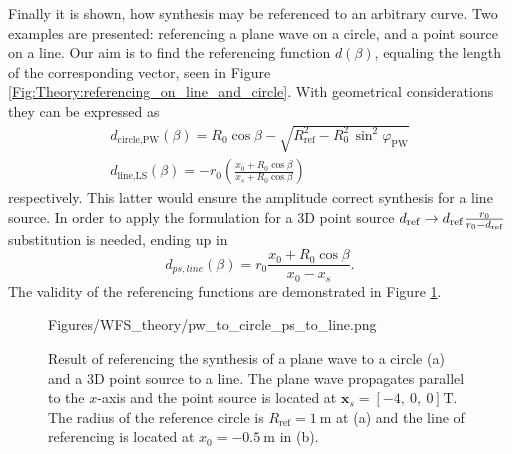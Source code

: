 Finally it is shown, how synthesis may be referenced to an arbitrary curve. 
Two examples are presented: referencing a plane wave on a circle, and a point source on a line.
Our aim is to find the referencing function $d(\beta)$, equaling the length of the corresponding vector, seen in Figure \ref{Fig:Theory:referencing_on_line_and_circle}. With geometrical considerations they can be expressed as
\begin{eqnarray}
d_\text{circle,PW}(\beta) = R_0\cos \beta - \sqrt{ R_{\mathrm{ref}}^2 - R_0^2\,\sin^2\varphi_\text{PW} }
\\
d_\text{line,LS}(\beta) = -r_0 \left( \frac{x_0 + R_0\cos \beta}{x_s + R_0\cos \beta} \right)
\end{eqnarray}
respectively. 
This latter would ensure the amplitude correct synthesis for a line source. In order to apply the formulation for a 3D point source  $d_{\mathrm{ref}} \rightarrow d_{\mathrm{ref}} \frac{r_0}{r_0 - d_{\mathrm{ref}}}$ substitution is needed, ending up in
\begin{equation}
d_{ps,line}(\beta) = r_0 \frac{x_0 + R_0\cos \beta}{x_0-x_s}.
\end{equation}
The validity of the referencing functions are demonstrated in Figure \ref{Fig:Theory:pw_to_circle_ps_to_line}.
\begin{figure}
	\centering
	\begin{overpic}[width = 1\columnwidth]{Figures/WFS_theory/pw_to_circle_ps_to_line.png}
	\end{overpic}
\caption{ Result of referencing the synthesis of a plane wave to a circle (a) and a 3D point source to a line. The plane wave propagates parallel to the $x$-axis and the point source is located at $\mathbf{x}_s = [-4,\ 0,\ 0]^{}\mathrm{T}$. The radius of the reference circle is $R_{\mathrm{ref}} = 1~\mathrm{m}$ at (a) and the line of referencing is located at $x_0 = -0.5~\mathrm{m}$ in (b).}
	\label{Fig:Theory:pw_to_circle_ps_to_line}
\end{figure}
%
%
	
%

